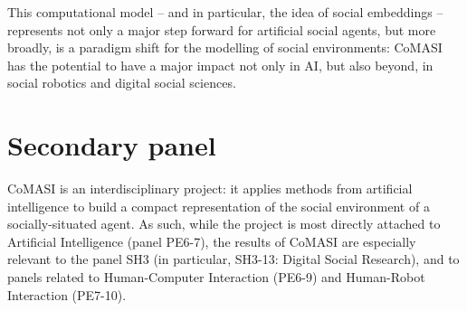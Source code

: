 \documentclass[11pt,a4paper]{report}
\newcommand{\project}{CoMASI\xspace}
\begin{document}

%
%
%

This computational model -- and in particular, the idea of social embeddings --
represents not only a major step forward for artificial social agents, but more
broadly, is a paradigm shift for the modelling of social environments: \project
has the potential to have a major impact not only in AI, but also beyond, in social
robotics and digital social sciences.



\section*{Secondary panel}\label{panels}

\project is an interdisciplinary project: it applies methods from artificial intelligence
to build a compact representation of the social environment of a
socially-situated agent. As such, while the project is
most directly attached to Artificial Intelligence (panel PE6-7), the results of
\project are especially relevant to the panel SH3 (in particular, SH3-13:
Digital Social Research), and to panels related to Human-Computer Interaction
(PE6-9) and Human-Robot Interaction (PE7-10).
\end{document}
